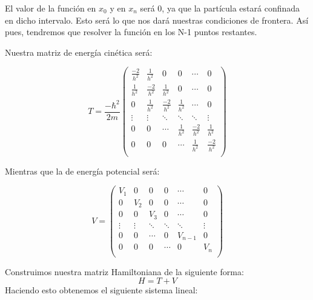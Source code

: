 \documentclass[12pt]{article}
\begin{document}
El valor de la función en $x_0$ y en $x_n$ será 0, ya que la partícula estará confinada en dicho intervalo. Esto será lo que nos dará nuestras condiciones de frontera. Así pues, tendremos que resolver la función en los N-1 puntos restantes.

Nuestra matriz de energía cinética será:

\begin{equation}
T=\frac{-\hbar^2}{2m} \left(
\begin{matrix}
\frac{-2}{h^2} & \frac{1}{h^2} & 0 & 0 &  \cdots & 0 \\
\frac{1}{h^2} & \frac{-2}{h^2} & \frac{1}{h^2} & 0 & \cdots & 0\\
0 & \frac{1}{h^2} & \frac{-2}{h^2} & \frac{1}{h^2} & \cdots & 0\\
\vdots & \vdots&\ddots &\ddots &\ddots& \vdots \\
0 & 0   &\cdots &\frac{1}{h^2}& \frac{-2}{h^2} & \frac{1}{h^2} \\
0 & 0 & 0  &\cdots & \frac{1}{h^2} & \frac{-2}{h^2} \\
\end{matrix}
\right)
\end{equation}

Mientras que la de energía potencial será:

\begin{equation}
V= \left(
\begin{matrix}
V_1 & 0 & 0 & 0 &  \cdots & 0 \\
0 & V_2 & 0 & 0 & \cdots & 0\\
0 & 0 & V_3 & 0 & \cdots & 0\\
\vdots & \vdots&\ddots &\ddots &\ddots& \vdots \\
0 & 0   &\cdots &0& V_{n-1} & 0 \\
0 & 0 & 0  &\cdots & 0 & V_{n} \\
\end{matrix}
\right)
\end{equation}

Construimos nuestra matriz Hamiltoniana de la siguiente forma:
\begin{equation}
H=T+V
\end{equation}
Haciendo esto obtenemos el siguiente sistema lineal: \\
\end{document}
